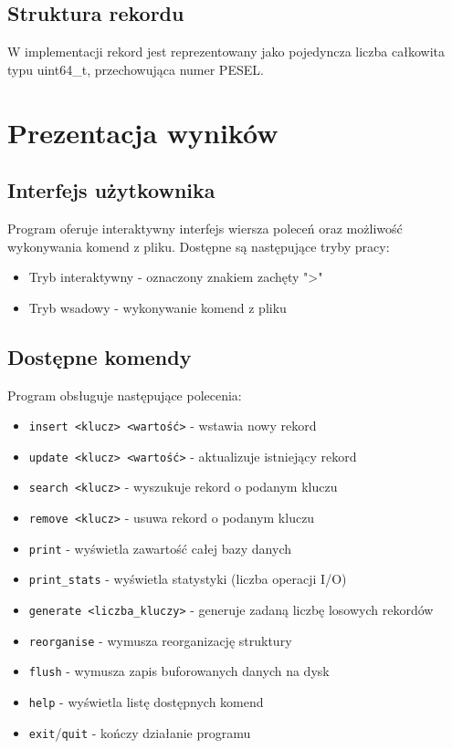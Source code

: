 \documentclass[12pt]{article}
\begin{document}
\subsection{Struktura rekordu}
W implementacji rekord jest reprezentowany jako pojedyncza liczba całkowita typu uint64\_t, przechowująca numer PESEL.

\section{Prezentacja wyników}
\subsection{Interfejs użytkownika}
Program oferuje interaktywny interfejs wiersza poleceń oraz możliwość wykonywania komend z pliku. Dostępne są następujące tryby pracy:
\begin{itemize}
    \item Tryb interaktywny - oznaczony znakiem zachęty ">"
    \item Tryb wsadowy - wykonywanie komend z pliku
\end{itemize}

\subsection{Dostępne komendy}
Program obsługuje następujące polecenia:
\begin{itemize}
    \item \texttt{insert <klucz> <wartość>} - wstawia nowy rekord
    \item \texttt{update <klucz> <wartość>} - aktualizuje istniejący rekord
    \item \texttt{search <klucz>} - wyszukuje rekord o podanym kluczu
    \item \texttt{remove <klucz>} - usuwa rekord o podanym kluczu
    \item \texttt{print} - wyświetla zawartość całej bazy danych
    \item \texttt{print\_stats} - wyświetla statystyki (liczba operacji I/O)
    \item \texttt{generate <liczba\_kluczy>} - generuje zadaną liczbę losowych rekordów
    \item \texttt{reorganise} - wymusza reorganizację struktury
    \item \texttt{flush} - wymusza zapis buforowanych danych na dysk
    \item \texttt{help} - wyświetla listę dostępnych komend
    \item \texttt{exit}/\texttt{quit} - kończy działanie programu
\end{itemize}
\end{document}

